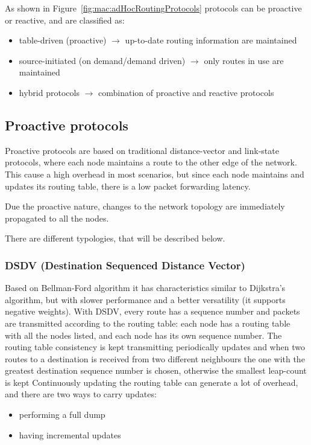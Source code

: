 As shown in Figure~\ref{fig:mac:adHocRoutingProtocols} protocols can be
proactive or reactive, and are classified as:
\begin{itemize}
\item table-driven (proactive) $\to$ up-to-date routing information are
  maintained
\item source-initiated (on demand/demand driven) $\to$ only routes in use are
  maintained
\item hybrid protocols $\to$ combination of proactive and reactive protocols
\end{itemize}

\subsection{Proactive protocols}

Proactive protocols are based on traditional distance-vector and link-state
protocols, where each node maintains a route to the other edge of the network.
This cause a high overhead in most scenarios, but since each node maintains and
updates its routing table, there is a low packet forwarding latency.

Due the proactive nature, changes to the network topology are immediately
propagated to all the nodes.

There are different typologies, that will be described below.

\subsubsection{DSDV (Destination Sequenced Distance Vector)}

Based on Bellman-Ford algorithm it has characteristics similar to Dijkstra's
algorithm, but with slower performance and a better versatility (it supports
negative weights). With DSDV, every route has a sequence number and packets are
transmitted according to the routing table: each node has a routing table with
all the nodes listed, and each node has its own sequence number.
The routing table consistency is kept transmitting periodically updates and when
two routes to a destination is received from two different neighbours the one
with the greatest destination sequence number is chosen, otherwise the smallest
leap-count is kept %
Continuously updating the routing table can generate a lot of overhead, and
there are two ways to carry updates:
\begin{itemize}
\item performing a full dump
\item having incremental updates
\end{itemize}

